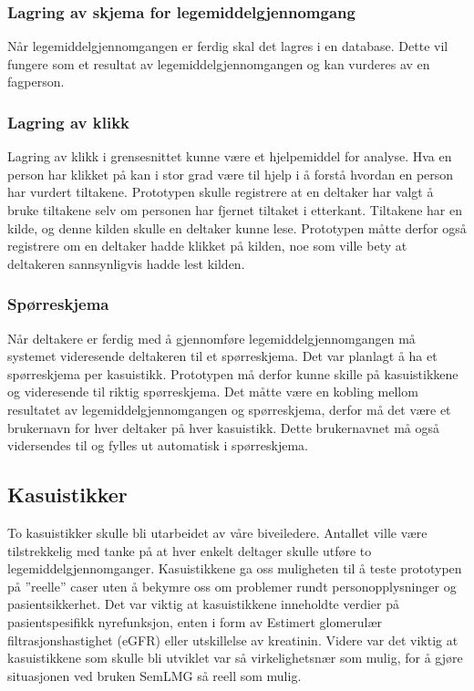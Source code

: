 \subsubsection{Lagring av skjema for legemiddelgjennomgang}
Når legemiddelgjennomgangen er ferdig skal det lagres i en database. Dette vil fungere som et resultat av legemiddelgjennomgangen og kan vurderes av en fagperson. 
\subsubsection{Lagring av klikk}
Lagring av klikk i grensesnittet kunne være et hjelpemiddel for analyse. Hva en person har klikket på kan i stor grad være til hjelp i å forstå hvordan en person har vurdert tiltakene. Prototypen skulle registrere at en deltaker har valgt å bruke tiltakene selv om personen har fjernet tiltaket i etterkant. Tiltakene har en kilde, og denne kilden skulle en deltaker kunne lese. Prototypen måtte derfor også registrere om en deltaker hadde klikket på kilden, noe som ville bety at deltakeren sannsynligvis hadde lest kilden.
\subsubsection{Spørreskjema}
Når deltakere er ferdig med å gjennomføre legemiddelgjennomgangen må systemet videresende deltakeren til et spørreskjema. Det var planlagt å ha et spørreskjema per kasuistikk. Prototypen må derfor kunne skille på kasuistikkene og videresende til riktig spørreskjema. Det måtte være en kobling mellom resultatet av legemiddelgjennomgangen og spørreskjema, derfor må det være et brukernavn for hver deltaker på hver kasuistikk. Dette brukernavnet må også vidersendes til og fylles ut automatisk i spørreskjema.

\subsection{Kasuistikker}
To kasuistikker skulle bli utarbeidet av våre biveiledere. Antallet ville være tilstrekkelig med tanke på at hver enkelt deltager skulle utføre to legemiddelgjennomganger. Kasuistikkene ga oss muligheten til å teste prototypen på ''reelle'' caser uten å bekymre oss om problemer rundt personopplysninger og pasientsikkerhet. Det var viktig at kasuistikkene inneholdte verdier på pasientspesifikk nyrefunksjon, enten i form av Estimert glomerulær filtrasjonshastighet (eGFR) eller utskillelse av kreatinin. Videre var det viktig at kasuistikkene som skulle bli utviklet var så virkelighetsnær som mulig, for å gjøre situasjonen ved bruken SemLMG så reell som mulig. 

